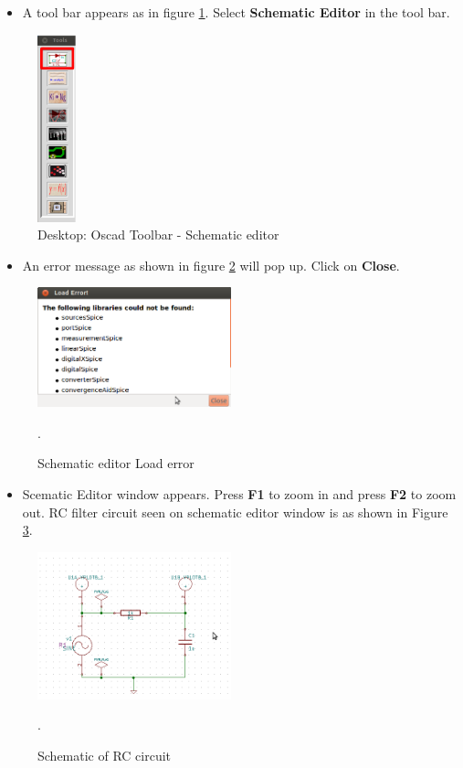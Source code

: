 \begin{itemize}
\item A tool bar appears as in figure \ref{tools}. Select \textbf{Schematic Editor} in the tool bar.
\end{itemize}
\begin{figure}[h]
\centering
\includegraphics[width=0.1\textwidth]{figures/tools.png}
\caption{Desktop: Oscad Toolbar - Schematic editor}
\label{tools}
\end{figure}
\begin{itemize}
\item An error message as shown in figure \ref{error} will pop up. Click on \textbf{Close}.
\end{itemize}
\begin{figure}[h]
\centering
\includegraphics[width=0.5\textwidth]{figures/error.png}
\caption{Schematic editor Load error }.
\label{error}
\end{figure}
\newpage
\begin{itemize}
\item Scematic Editor window appears. Press \textbf{F1} to zoom in and press \textbf{F2} to zoom out. RC filter circuit seen on schematic editor window is as shown in Figure \ref{schematic}.
\end{itemize}
\begin{figure}[h]
\centering
\includegraphics[width=0.5\textwidth]{figures/schematic.png}
\caption{Schematic of RC circuit }.
\label{schematic}
\end{figure}
